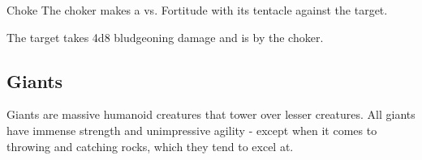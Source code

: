     \begin{freeability}{Choke}
       The choker makes a 
         vs. Fortitude
        with its tentacle against the target.
    
    \hit The target takes 4d8 bludgeoning damage and is  by the choker.
    \end{freeability}
  
    \subsection{Giants}
      
      Giants are massive humanoid creatures that tower over lesser creatures.
      All giants have immense strength and unimpressive agility - except when it comes to throwing and catching rocks, which they tend to excel at.
    

